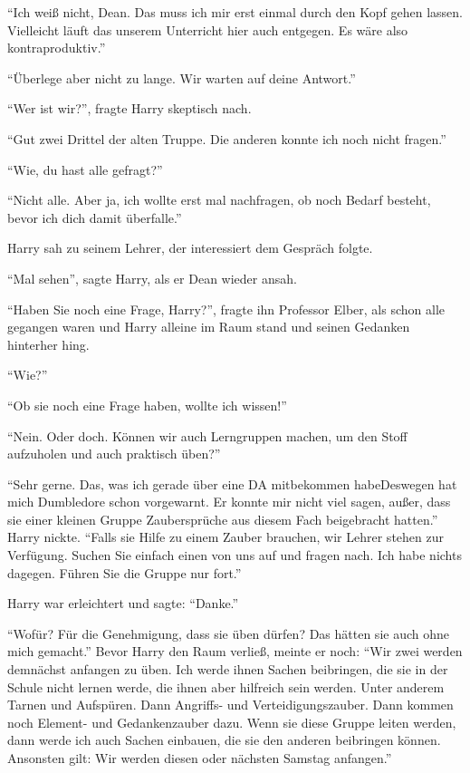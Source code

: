 \enquote{Ich weiß nicht, Dean. Das muss ich mir erst einmal durch den Kopf gehen lassen. Vielleicht läuft das unserem Unterricht hier auch entgegen. Es wäre also kontraproduktiv.}

\enquote{Überlege aber nicht zu lange. Wir warten auf deine Antwort.}

\enquote{Wer ist wir?}, fragte Harry skeptisch nach.

\enquote{Gut zwei Drittel der alten Truppe. Die anderen konnte ich noch nicht fragen.}

\enquote{Wie, du hast alle gefragt?}

\enquote{Nicht alle. Aber ja, ich wollte erst mal nachfragen, ob noch Bedarf besteht, bevor ich dich damit überfalle.}

Harry sah zu seinem Lehrer, der interessiert dem Gespräch folgte.

\enquote{Mal sehen}, sagte Harry, als er Dean wieder ansah.

\enquote{Haben Sie noch eine Frage, Harry?}, fragte ihn Professor Elber, als schon alle gegangen waren und Harry alleine im Raum stand und seinen Gedanken hinterher hing.

\enquote{Wie?}

\enquote{Ob sie noch eine Frage haben, wollte ich wissen!}

\enquote{Nein. Oder doch. Können wir auch Lerngruppen machen, um den Stoff aufzuholen und auch praktisch üben?}

\enquote{Sehr gerne. \gst Das, was ich gerade über eine DA mitbekommen habe\abs Deswegen hat mich Dumbledore schon vorgewarnt. Er konnte mir nicht viel sagen, außer, dass sie einer kleinen Gruppe Zaubersprüche aus diesem Fach beigebracht hatten.} Harry nickte. \enquote{Falls sie Hilfe zu einem Zauber brauchen, wir Lehrer stehen zur Verfügung. Suchen Sie einfach einen von uns auf und fragen nach. Ich habe nichts dagegen. Führen Sie die Gruppe nur fort.}

Harry war erleichtert und sagte: \enquote{Danke.}

\enquote{Wofür? Für die Genehmigung, dass sie üben dürfen? Das hätten sie auch ohne mich gemacht.} Bevor Harry den Raum verließ, meinte er noch: \enquote{Wir zwei werden demnächst anfangen zu üben. Ich werde ihnen Sachen beibringen, die sie in der Schule nicht lernen werde, die ihnen aber hilfreich sein werden. Unter anderem Tarnen und Aufspüren. Dann Angriffs- und Verteidigungszauber. Dann kommen noch Element- und Gedankenzauber dazu. Wenn sie diese Gruppe leiten werden, dann werde ich auch Sachen einbauen, die sie den anderen beibringen können. Ansonsten gilt:  Wir werden diesen oder nächsten Samstag anfangen.}

